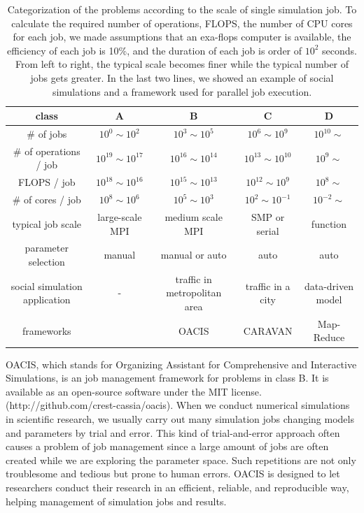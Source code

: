 \begin{table}[htb]
  \caption{Categorization of the problems according to the scale of single simulation job.
  To calculate the required number of operations, FLOPS, the number of CPU cores for each job, we made assumptions that an exa-flops computer is available, the efficiency of each job is 10\%, and the duration of each job is order of $10^2$ seconds.
  From left to right, the typical scale becomes finer while the typical number of jobs gets greater.
  In the last two lines, we showed an example of social simulations and a framework used for parallel job execution.
  }
  \label{tab:problem_scale}
  \centering
  \begin{tabular}{|c|cccc|} \hline
    class      & A                & B                & C                & D \\ \hline
    \# of jobs & $10^0 \sim 10^2$ & $10^3 \sim 10^5$ & $10^6 \sim 10^9$ & $10^{10} \sim$ \\
    \# of operations / job & $10^{19} \sim 10^{17}$ & $10^{16} \sim 10^{14}$ & $10^{13} \sim 10^{10}$ & $10^{9} \sim$ \\
    FLOPS / job & $10^{18} \sim 10^{16}$ & $10^{15} \sim 10^{13}$ & $10^{12} \sim 10^{9}$ & $10^{8} \sim$ \\
    \# of cores / job & $10^{8} \sim 10^{6}$ & $10^{5} \sim 10^{3}$ & $10^{2} \sim 10^{-1}$ & $10^{-2} \sim$ \\
    typical job scale & large-scale MPI & medium scale MPI & SMP or serial & function \\
    parameter selection & manual & manual or auto & auto & auto \\
    social simulation application & - & traffic in metropolitan area & traffic in a city & data-driven model \\
    frameworks & & OACIS & CARAVAN & Map-Reduce \\
    \hline
  \end{tabular}
\end{table}

OACIS, which stands for Organizing Assistant for Comprehensive and Interactive Simulations, is an job management framework for problems in class B\cite{murase_phys_proc}.
It is available as an open-source software under the MIT license. (http://github.com/crest-cassia/oacis).
When we conduct numerical simulations in scientific research, we usually carry out many simulation jobs changing models and parameters by trial and error.
This kind of trial-and-error approach often causes a problem of job management since a large amount of jobs are often created while we are exploring the parameter space.
Such repetitions are not only troublesome and tedious but prone to human errors.
OACIS is designed to let researchers conduct their research in an efficient, reliable, and reproducible way, helping management of simulation jobs and results.

